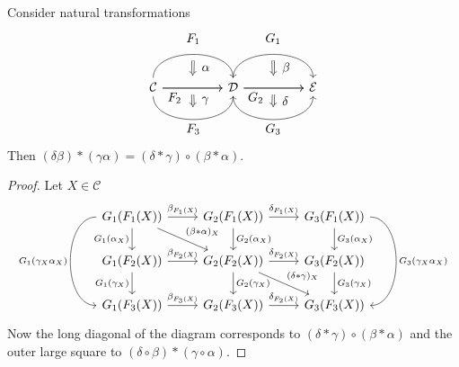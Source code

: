 \begin{prop}
    Consider natural transformations 
    \[
    \begin{tikzcd}[column sep=huge]	
    	\mathcal{C}
    	\arrow[bend left=90]{r}[name=U,label=above:$F_1$]{}
    	\arrow[bend right=90]{r}[name=D,label=below:$F_3$]{}
    	\arrow{r}[name=M]{}
    	\arrow{r}[label=below:$F_2$, pos=0.2]{}
    	&
    	\mathcal{D}
    	\arrow[shorten <=5pt,shorten >=5pt,Rightarrow,to path={(U) -- node[label=right:$\alpha$] {} (M)}]{}
    	\arrow[shorten <=5pt,shorten >=5pt,Rightarrow,to path={(M) -- node[label=right:$\gamma$] {} (D)}]{}
    	\arrow[bend left=90]{r}[name=U',label=above:$G_1$]{}
    	\arrow[bend right=90]{r}[name=D',label=below:$G_3$]{}
    	\arrow{r}[name=M']{}
    	\arrow{r}[label=below:$G_2$, pos=0.2]{}
    	&
    	\mathcal{E} 
    	\arrow[shorten <=5pt,shorten >=5pt,Rightarrow,to path={(U') -- node[label=right:$\beta$] {} (M')}]{}
    	\arrow[shorten <=5pt,shorten >=5pt,Rightarrow,to path={(M') -- node[label=right:$\delta$] {} (D')}]{}    	
    \end{tikzcd}	
	\]
    Then $ ( \delta \beta ) * ( \gamma \alpha ) = ( \delta * \gamma ) \circ ( \beta * \alpha )$.
\end{prop}

\begin{proof}
    Let $ X \in \mathcal{ C } $ 
    \[
    \begin{tikzcd}
        G_1 ( F_1 ( X ) ) 
        \ar[r, " \beta_ {F_1 ( X ) }"]
        \ar[rd, " ( \beta * \alpha )_X "]
        \ar[d, " G_1 (\alpha_X ) "']
        \ar[dd, bend right=90, " G_1 ( \gamma_X \alpha_X ) "']
        &
        G_2 ( F_1 ( X ) ) 
        \ar[d, " G_2 ( \alpha_X ) "]
        \ar[r, " \delta_{ F_1 ( X ) }"]
        &
        G_3 ( F_1 ( X ) ) 
        \ar[dd, bend left =90, " G_3 ( \gamma_X \alpha_X ) "]
        \ar[ d , " G_3 ( \alpha_X ) "]
        \\
        G_1 ( F_2 ( X ) ) 
        \ar[d, " G_1 ( \gamma_X )"']
        \ar[r, " \beta_{ F_2 ( X ) }"]
        &
        G_2 ( F_2 ( X ) ) 
        \ar[r, " \delta_{ F_2 ( X ) }"]
        \ar[d, " G_2 ( \gamma_X ) "]
        \ar[rd, " ( \delta * \gamma )_X "]
        &
        G_3 ( F_2 ( X ) ) 
        \ar[d, " G_3 ( \gamma_X ) "]
        \\
        G_1 ( F_3 ( X ) ) 
        \ar[r, " \beta_{ F_3 ( X ) }"]
        &
        G_2 ( F_3 ( X ) )
        \ar[r , " \delta_{F_2 ( X ) }"]
        &
        G_3 ( F_3 ( X ) ) 
    \end{tikzcd}
    \]
    Now the long diagonal of the diagram corresponds to $ ( \delta * \gamma ) \circ ( \beta * \alpha ) $ and the outer large square to $ ( \delta \circ \beta ) * ( \gamma \circ \alpha )$.
\end{proof}

